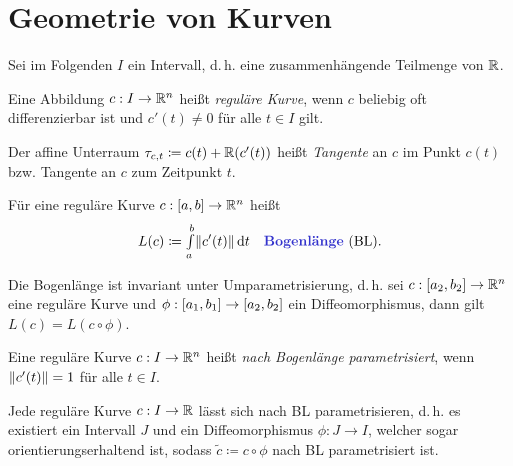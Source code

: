 \documentclass{cheat-sheet}
\newcommand{\Intabdt}[1]{\Int{a}{b}{#1}{t}}
\begin{document}

\section{Geometrie von Kurven}





\begin{nota}
  Sei im Folgenden $I$ ein Intervall, d.\,h. eine zusammenhängende Teilmenge von $\mathbb{R}$.
\end{nota}

\begin{defn}
  Eine Abbildung $c : I \to \mathbb{R}^n$ heißt \emph{reguläre Kurve}, wenn $c$ beliebig oft differenzierbar ist und $c'(t) \not= 0$ für alle $t \in I$ gilt.

  Der affine Unterraum $\tau_{c,t} \coloneqq c(t) + \mathbb{R}(c'(t))$ heißt \emph{Tangente} an $c$ im Punkt $c(t)$ bzw. Tangente an $c$ zum Zeitpunkt $t$.
\end{defn}


\begin{defn}
  Für eine reguläre Kurve $c : \left[ a, b \right] \to \mathbb{R}^n$ heißt
  \[ L(c) \coloneqq \Intabdt{\norm{c'(t)}} \quad \text{\emph{Bogenlänge} (BL).} \]
\end{defn}

\begin{satz}
  Die Bogenlänge ist invariant unter Umparametrisierung, d.\,h. sei $c : \left[ a_2, b_2 \right] \to \mathbb{R}^n$ eine reguläre Kurve und $\phi : \left[ a_1, b_1 \right] \to \left[ a_2, b_2 \right]$ ein Diffeomorphismus, dann gilt $L(c) = L(c \circ \phi)$.
\end{satz}

\begin{defn}
  Eine reguläre Kurve $c : I \to \mathbb{R}^n$ heißt \emph{nach Bogenlänge parametrisiert}, wenn $\lVert c'(t)\rVert = 1$ für alle $t \in I$.
\end{defn}

\begin{satz}
  Jede reguläre Kurve $c : I \to \mathbb{R}$ lässt sich nach BL parametrisieren, d.\,h. es existiert ein Intervall $J$ und ein Diffeomorphismus $\phi : J \to I$, welcher sogar orientierungserhaltend ist, sodass $\tilde{c} \coloneqq c \circ \phi$ nach BL parametrisiert ist.
\end{satz}
\end{document}
